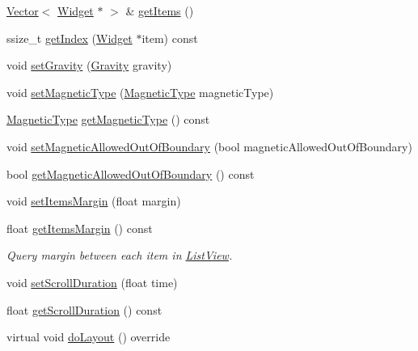 \begin{DoxyCompactItemize}
\item 
\hyperlink{classVector}{Vector}$<$ \hyperlink{classui_1_1Widget}{Widget} $\ast$ $>$ \& \hyperlink{classui_1_1ListView_a92a6e83bdbfec80ae5133ab7ccd0a824}{get\+Items} ()
\item 
ssize\+\_\+t \hyperlink{classui_1_1ListView_a4f0306a68670aba071042347db7fe21e}{get\+Index} (\hyperlink{classui_1_1Widget}{Widget} $\ast$item) const
\item 
void \hyperlink{classui_1_1ListView_ae65016cdf079cded10de1db27fff4be9}{set\+Gravity} (\hyperlink{classui_1_1ListView_af79b44631b38c1782c384830acf20cf6}{Gravity} gravity)
\item 
void \hyperlink{classui_1_1ListView_ab94e44098f2d082aaf5dab97a4a02f61}{set\+Magnetic\+Type} (\hyperlink{classui_1_1ListView_a143593e762b785241572552b060aed6f}{Magnetic\+Type} magnetic\+Type)
\item 
\hyperlink{classui_1_1ListView_a143593e762b785241572552b060aed6f}{Magnetic\+Type} \hyperlink{classui_1_1ListView_a78e5f1e9024b6d195035e07e4183976d}{get\+Magnetic\+Type} () const
\item 
void \hyperlink{classui_1_1ListView_a0869253d15f9257c5313c5b156bc5ba5}{set\+Magnetic\+Allowed\+Out\+Of\+Boundary} (bool magnetic\+Allowed\+Out\+Of\+Boundary)
\item 
bool \hyperlink{classui_1_1ListView_acfed7db635b37551e6a1429b54dd8178}{get\+Magnetic\+Allowed\+Out\+Of\+Boundary} () const
\item 
void \hyperlink{classui_1_1ListView_a945511bd4d4c08d528bd1cf50dbedb35}{set\+Items\+Margin} (float margin)
\item 
float \hyperlink{classui_1_1ListView_a1b035dc59aabb5c9addcef3e16917900}{get\+Items\+Margin} () const
\begin{DoxyCompactList}\small\item\em Query margin between each item in \hyperlink{classui_1_1ListView}{List\+View}. \end{DoxyCompactList}\item 
void \hyperlink{classui_1_1ListView_a9f0e93625317fa86700986bed97efc88}{set\+Scroll\+Duration} (float time)
\item 
float \hyperlink{classui_1_1ListView_a85116b79e39403d670411684410feef0}{get\+Scroll\+Duration} () const
\item 
\mbox{\label{classui_1_1ListView_ad633b42ebb764e761a41c73643189dc4}} 
virtual void \hyperlink{classui_1_1ListView_ad633b42ebb764e761a41c73643189dc4}{do\+Layout} () override

\end{DoxyCompactItemize}
